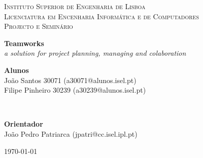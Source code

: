 ﻿\documentclass[pdftex,fontsize=20pt,a4paper]{scrbook}
\begin{document}
\begin{titlepage}
\begin{center}
\begin{minipage}{0.8\textwidth}
\begin{center}
\textsc{\scriptsize Instituto Superior de Engenharia de Lisboa}\\
\textsc{\footnotesize Licenciatura em Encenharia Informática e de Computadores }\\[1cm]
\textsc{\footnotesize Projecto e Seminário}\\
\vspace*{1cm}
\end{center}
\end{minipage}
{ \huge\bfseries Teamworks }\\[1cm]
{ \emph{a solution for project planning, managing and colaboration} }\\[4cm]
\begin{minipage}{1\textwidth}
\begin{center}
\textbf{\small{Alunos}}\\
\footnotesize
João Santos 30071 (a30071@alunos.isel.pt) \\
Filipe Pinheiro 30239 (a30239@alunos.isel.pt)
\end{center}
\end{minipage}\\[0.5cm]
\begin{minipage}{1\textwidth}
\begin{center}
\textbf{\small{Orientador}}\\
\footnotesize
João Pedro Patriarca (jpatri@cc.isel.ipl.pt)
\end{center}
\end{minipage}
\vfill
{\footnotesize \today}
\end{center}
\end{titlepage}
\clearpage
\end{document}
